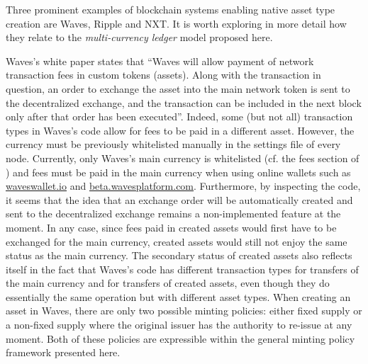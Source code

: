 \documentclass{llncs}
\begin{document}
Three prominent examples of blockchain systems enabling native asset type creation are Waves, Ripple and NXT. It is worth exploring in more detail how they relate to the \emph{multi-currency ledger} model proposed here.

Waves's white paper \cite{Waves} states that ``Waves will allow payment of network transaction fees in custom tokens (assets). Along with the transaction in question, an order to exchange the asset into the main network token is sent to the decentralized exchange, and the transaction can be included in the next block only after that order has been executed''. Indeed, some (but not all) transaction types in Waves's code allow for fees to be paid in a different asset. However, the currency must be previously whitelisted manually in the settings file of every node. Currently, only Waves's main currency is whitelisted (cf. the fees section of \cite{WavesCodeApplicationConf}) and fees must be paid in the main currency when using online wallets such as \url{waveswallet.io} and \url{beta.wavesplatform.com}. Furthermore, by inspecting the code, it seems that the idea that an exchange order will be automatically created and sent to the decentralized exchange remains a non-implemented feature at the moment. In any case, since fees paid in created assets would first have to be exchanged for the main currency, created assets would still not enjoy the same status as the main currency. The secondary status of created assets also reflects itself in the fact that Waves's code has different transaction types for transfers of the main currency and for transfers of created assets, even though they do essentially the same operation but with different asset types. When creating an asset in Waves, there are only two possible minting policies: either fixed supply or a non-fixed supply where the original issuer has the authority to re-issue at any moment. Both of these policies are expressible within the general minting policy framework presented here.
\end{document}
